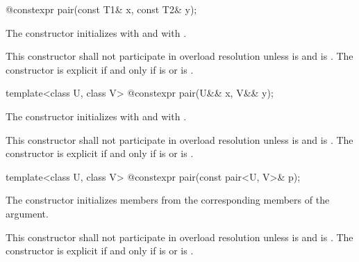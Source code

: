 \begin{itemdecl}
@\EXPLICIT@ constexpr pair(const T1& x, const T2& y);
\end{itemdecl}

\begin{itemdescr}
\pnum
\effects
The constructor initializes  with  and 
with .
\end{itemdescr}

\pnum
\remarks This constructor shall not participate in overload resolution
unless  is  and
 is .
The constructor is explicit if and only if
 is  or
 is .

\begin{itemdecl}
template<class U, class V> @\EXPLICIT@ constexpr pair(U&& x, V&& y);
\end{itemdecl}

\begin{itemdescr}
\pnum
\effects
The constructor initializes  with
 and 
with .

\pnum
\notes
This constructor shall not participate in overload resolution unless
 is  and
 is .
The constructor is explicit if and only if
 is  or
 is .
\end{itemdescr}

\begin{itemdecl}
template<class U, class V> @\EXPLICIT@ constexpr pair(const pair<U, V>& p);
\end{itemdecl}

\begin{itemdescr}
\pnum
\effects
The constructor initializes members from the corresponding members of the argument.

\pnum
\remarks This constructor shall not participate in overload resolution unless
 is  and
 is .
The constructor is explicit if and only if
 is  or
 is .
\end{itemdescr}

